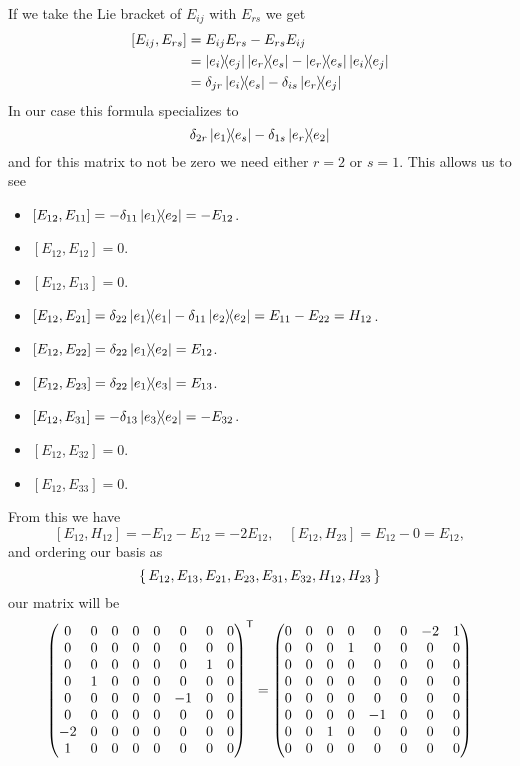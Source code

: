 \documentclass[12pt]{memoir}
\begin{document}
\begin{ptcbr}
    If we take the Lie bracket of $E_{ij}$ with $E_{rs}$ we get
    \begin{align*}
        \left\lbrack E_{ij},E_{rs}\right\rbrack&=E_{ij}E_{rs}-E_{rs}E_{ij}\\
        &=\ketbra{e_i}{e_j}\ketbra{e_r}{e_s}-\ketbra{e_r}{e_s}\ketbra{e_i}{e_j}\\
        &=\delta_{jr}\ketbra{e_i}{e_s}-\delta_{is}\ketbra{e_r}{e_j}
    \end{align*}
    In our case this formula specializes to 
    $$\delta_{2r}\ketbra{e_1}{e_s}-\delta_{1s}\ketbra{e_r}{e_2}$$
    and for this matrix to not be zero we need either $r=2$ or $s=1$. This allows us to see 
        \begin{itemize}
            \item $[E_{12},E_{11}]=-\delta_{11}\ketbra{e_1}{e_2}=-E_{12}$.
            \item $[E_{12},E_{12}]=0$.
            \item $[E_{12},E_{13}]=0$.
            \item $[E_{12},E_{21}]=\delta_{22}\ketbra{e_1}{e_1}-\delta_{11}\ketbra{e_2}{e_2}=E_{11}-E_{22}=H_{12}$.
            \item $[E_{12},E_{22}]=\delta_{22}\ketbra{e_1}{e_2}=E_{12}$.
            \item $[E_{12},E_{23}]=\delta_{22}\ketbra{e_1}{e_3}=E_{13}$.
            \item $[E_{12},E_{31}]=-\delta_{13}\ketbra{e_3}{e_2}=-E_{32}$.
            \item $[E_{12},E_{32}]=0$.
            \item $[E_{12},E_{33}]=0$.
        \end{itemize}
        From this we have
        $$[E_{12},H_{12}]=-E_{12}-E_{12}=-2E_{12},\quad[E_{12},H_{23}]=E_{12}-0=E_{12},$$
        and ordering our basis as 
        $$\{\,E_{12},E_{13},E_{21},E_{23},E_{31},E_{32},H_{12},H_{23}\,\}$$
        our matrix will be 
        $$\begin{pmatrix}
            0&0&0&0&0&0&0&0\\
            0&0&0&0&0&0&0&0\\
            0&0&0&0&0&0&1&0\\
            0&1&0&0&0&0&0&0\\
            0&0&0&0&0&-1&0&0\\
            0&0&0&0&0&0&0&0\\
            -2&0&0&0&0&0&0&0\\
            1&0&0&0&0&0&0&0
        \end{pmatrix}^{\mathsf{T}}=\begin{pmatrix}
            0&0&0&0&0&0&-2&1\\
            0&0&0&1&0&0&0&0\\
            0&0&0&0&0&0&0&0\\
            0&0&0&0&0&0&0&0\\
            0&0&0&0&0&0&0&0\\
            0&0&0&0&-1&0&0&0\\
            0&0&1&0&0&0&0&0\\
            0&0&0&0&0&0&0&0
        \end{pmatrix}$$
\end{ptcbr}
\end{document}
